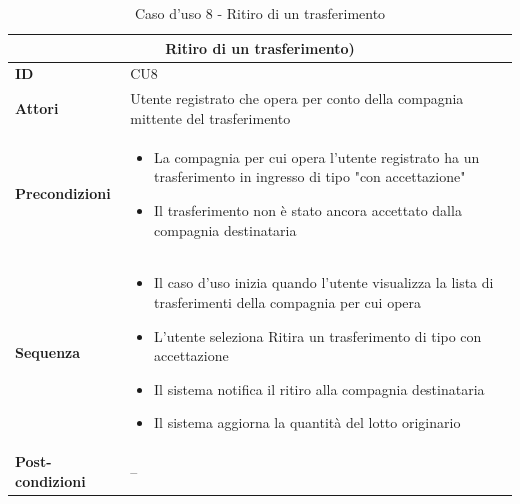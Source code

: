 \documentclass[a4paper,11pt]{article}
\begin{document}
\begin{table}[H]
  \centering
  \begin{tabular}{|m{2cm}|m{10.5cm}|}
    \hline
    \multicolumn{2}{|c|}{\textbf{Ritiro di un trasferimento)}} \\ \hline
    \multicolumn{1}{|l|}{\textbf{ID}}              & CU8       \\ \hline
    \multicolumn{1}{|l|}{\textbf{Attori}}          &

    Utente registrato che opera per conto della compagnia mittente del trasferimento

    \\ \hline
    \multicolumn{1}{|l|}{\textbf{Precondizioni}}   &
    \begin{itemize}
      \item La compagnia per cui opera l'utente registrato ha un trasferimento in ingresso di tipo "con accettazione"
      \item Il trasferimento non è stato ancora accettato dalla compagnia destinataria
    \end{itemize}
    \\ \hline
    \multicolumn{1}{|l|}{\textbf{Sequenza}}        &

    \begin{itemize}
      \item Il caso d'uso inizia quando l'utente visualizza la lista di trasferimenti della compagnia per cui opera
      \item L'utente seleziona Ritira un trasferimento di tipo con accettazione
      \item Il sistema notifica il ritiro alla compagnia destinataria
      \item Il sistema aggiorna la quantità del lotto originario
    \end{itemize}

    \\ \hline
    \multicolumn{1}{|l|}{\textbf{Post-condizioni}} & --        \\ \hline
  \end{tabular}
  \caption{Caso d'uso 8 - Ritiro di un trasferimento}
  \label{cu:CU8}
\end{table}
\end{document}
